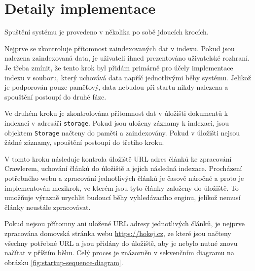 \documentclass{article}
\begin{document}
\section{Detaily implementace}
Spuštění systému je provedeno v několika po sobě jdoucích krocích.

Nejprve se zkontroluje přítomnost zaindexovaných dat v indexu. Pokud jsou nalezena zaindexovaná data, je uživateli ihned prezentováno uživatelské rozhraní. Je třeba zmínit, že tento krok byl přidám primárně pro účely implementace indexu v souboru, který uchovává data napříč jednotlivými běhy systému. Jelikož je podporován pouze paměťový, data nebudou při startu nikdy nalezena a spouštění postoupí do druhé fáze.

Ve druhém kroku je zkontrolována přítomnost dat v úložišti dokumentů k indexaci v adresáři \texttt{storage}. Pokud jsou uloženy záznamy k indexaci, jsou objektem \texttt{Storage} načteny do paměti a zaindexovány. Pokud v úložišti nejsou žádné záznamy, spouštění postoupí do třetího kroku.

V tomto kroku následuje kontrola úložiště URL adres článků ke zpracování Crawlerem, uchování článků do úložiště a jejich následná indexace. Procházení potřebného webu a zpracování jednotlivých článků je časově náročné a proto je implementován mezikrok, ve kterém jsou tyto články založeny do úložiště. To umožňuje výrazně urychlit budoucí běhy vyhledávacího enginu, jelikož nemusí články neustále zpracovávat.

Pokud nejsou přítomny ani uložené URL adresy jednotlivých článků, je nejprve zpracována domovská stránka webu \url{https://hokej.cz}, ze které jsou načteny všechny potřebné URL a jsou přidány do úložiště, aby je nebylo nutné znovu načítat v příštím běhu. Celý proces je znázorněn v sekvenčním diagramu na obrázku \ref{fig:startup-sequence-diagram}.
\end{document}

